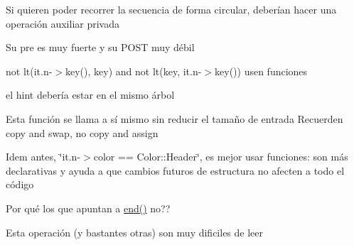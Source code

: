 \begin{DoxyRefList}
Si quieren poder recorrer la secuencia de forma circular, deberían hacer una operación auxiliar privada 
\item[\label{deprecated__deprecated000024}%
\hypertarget{deprecated__deprecated000024}{}%
Miembro \hyperlink{classaed2_1_1map_1_1iterator_ad052c1ef8477a1613c292202226053a5_ad052c1ef8477a1613c292202226053a5}{aed2\+:\+:map$<$ Key, Meaning, Compare $>$\+:\+:iterator\+:\+:operator==} (iterator other) const ]Su pre es muy fuerte y su P\+O\+ST muy débil 
\item[\label{deprecated__deprecated000011}%
\hypertarget{deprecated__deprecated000011}{}%
Miembro \hyperlink{classaed2_1_1map_a3399d36fdd5a880b494f3a5795d3f18f_a3399d36fdd5a880b494f3a5795d3f18f}{aed2\+:\+:map$<$ Key, Meaning, Compare $>$\+:\+:lower\+\_\+bound} (const Key \&key) const ]not lt(it.\+n-\/$>$key(), key) and not lt(key, it.\+n-\/$>$key()) usen funciones 
\item[\label{deprecated__deprecated000003}%
\hypertarget{deprecated__deprecated000003}{}%
Miembro \hyperlink{classaed2_1_1map_a7a77950a3d8e637bfa7cf5dcd904f257_a7a77950a3d8e637bfa7cf5dcd904f257}{aed2\+:\+:map$<$ Key, Meaning, Compare $>$\+:\+:map} (const map \&other)]el hint debería estar en el mismo árbol 
\item[\label{deprecated__deprecated000004}%
\hypertarget{deprecated__deprecated000004}{}%
Miembro \hyperlink{classaed2_1_1map_ac606d334809066929522964d45e76317_ac606d334809066929522964d45e76317}{aed2\+:\+:map$<$ Key, Meaning, Compare $>$\+:\+:operator=} (map other)]Esta función se llama a sí mismo sin reducir el tamaño de entrada Recuerden copy and swap, no copy and assign 
\item[\label{deprecated__deprecated000007}%
\hypertarget{deprecated__deprecated000007}{}%
Miembro \hyperlink{classaed2_1_1map_a96f23896164ab47bee48c26b803f9801_a96f23896164ab47bee48c26b803f9801}{aed2\+:\+:map$<$ Key, Meaning, Compare $>$\+:\+:operator\mbox{[}\mbox{]}} (const Key \&key)]Idem antes, \char`\"{}it.\+n-\/$>$color == Color\+::\+Header\char`\"{}, es mejor usar funciones\+: son más declarativas y ayuda a que cambios futuros de estructura no afecten a todo el código 
\item[\label{deprecated__deprecated000005}%
\hypertarget{deprecated__deprecated000005}{}%
Miembro \hyperlink{classaed2_1_1map_ab22c9a85c2dadbc286cd30e97069a8e6_ab22c9a85c2dadbc286cd30e97069a8e6}{aed2\+:\+:map$<$ Key, Meaning, Compare $>$\+:\+:$\sim$map} ()]Por qué los que apuntan a \hyperlink{classaed2_1_1map_a76023e6a56cb625513e1b5ea028bf983_a76023e6a56cb625513e1b5ea028bf983}{end()} no?? 
\item[\label{deprecated__deprecated000001}%
\hypertarget{deprecated__deprecated000001}{}%
Página \hyperlink{axiomas}{Axiomas y proposiciones auxiliares} ]Esta operación (y bastantes otras) son muy dificiles de leer 


\end{DoxyRefList}
